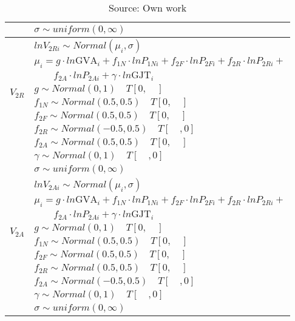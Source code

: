\begin{table}[!ht]
\begin{tabular} {ll}
                          &$\sigma \sim uniform(0,\infty) $\\ 
\hline
\multirow{8}{*}{$V_{2R}$} &$lnV_{2Ri} \sim Normal(\mu_i, \sigma) $ \\
                          &$\mu_i = g \cdot ln \text{GVA}_i + f_{1N} \cdot lnP_{1Ni} + f_{2F} \cdot lnP_{2Fi} + f_{2R} \cdot lnP_{2Ri} + $\\
                          &$\quad \quad f_{2A} \cdot lnP_{2Ai} + \gamma \cdot ln\text{GJT}_i$ \\
                          &$g \sim Normal (0,1) \quad T[0,\quad]$\\
                          &$f_{1N} \sim Normal (0.5,0.5) \quad T[0,\quad]$\\
                          &$f_{2F} \sim Normal (0.5,0.5) \quad T[0,\quad]$\\
                          &$f_{2R} \sim Normal (-0.5,0.5) \quad T[\quad,0]$\\
                          &$f_{2A} \sim Normal (0.5,0.5) \quad T[0,\quad]$\\
                          &$\gamma \sim Normal (0,1)  \quad T[\quad,0]$\\
                          &$\sigma \sim uniform(0,\infty) $\\ 
\hline
\multirow{8}{*}{$V_{2A}$} &$lnV_{2Ai} \sim Normal(\mu_i, \sigma) $ \\
                          &$\mu_i = g \cdot ln \text{GVA}_i + f_{1N} \cdot lnP_{1Ni} + f_{2F} \cdot lnP_{2Fi} + f_{2R} \cdot lnP_{2Ri} + $\\
                          &$\quad \quad f_{2A} \cdot lnP_{2Ai} + \gamma \cdot ln\text{GJT}_i$ \\
                          &$g \sim Normal (0,1) \quad T[0,\quad]$\\
                          &$f_{1N} \sim Normal (0.5,0.5) \quad T[0,\quad]$\\
                          &$f_{2F} \sim Normal (0.5,0.5) \quad T[0,\quad]$\\
                          &$f_{2R} \sim Normal (0.5,0.5) \quad T[0,\quad]$\\
                          &$f_{2A} \sim Normal (-0.5,0.5) \quad T[\quad,0]$\\
                          &$\gamma \sim Normal (0,1)  \quad T[\quad,0]$\\
                          &$\sigma \sim uniform(0,\infty) $\\ 
\bottomrule
\end{tabular}%
\caption*{Source: Own work}
\end{table} 
